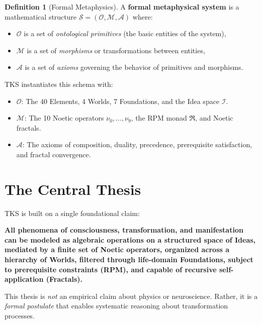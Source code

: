 \documentclass[11pt,twoside,openright]{book}
\theoremstyle{definition}
\newtheorem{definition}{Definition}[chapter]
\theoremstyle{plain}
\theoremstyle{remark}
\newcommand{\Ideas}{\mathcal{I}}
\newcommand{\noe}[1]{\nu_{#1}}
\newcommand{\RPM}{\mathfrak{R}}
\begin{document}
\begin{definition}[Formal Metaphysics]
\label{def:formal-metaphysics}
A \textbf{formal metaphysical system} is a mathematical structure $\mathcal{S} = (\mathcal{O}, \mathcal{M}, \mathcal{A})$ where:
\begin{itemize}
  \item $\mathcal{O}$ is a set of \emph{ontological primitives} (the basic entities of the system),
  \item $\mathcal{M}$ is a set of \emph{morphisms} or transformations between entities,
  \item $\mathcal{A}$ is a set of \emph{axioms} governing the behavior of primitives and morphisms.
\end{itemize}
\end{definition}

TKS instantiates this schema with:
\begin{itemize}
  \item $\mathcal{O}$: The 40 Elements, 4 Worlds, 7 Foundations, and the Idea space $\Ideas$.
  \item $\mathcal{M}$: The 10 Noetic operators $\noe{0}, \ldots, \noe{9}$, the RPM monad $\RPM$, and Noetic fractals.
  \item $\mathcal{A}$: The axioms of composition, duality, precedence, prerequisite satisfaction, and fractal convergence.
\end{itemize}

\section{The Central Thesis}

TKS is built on a single foundational claim:

\begin{tcolorbox}[colback=blue!5!white,colframe=blue!75!black,title=Central Thesis of TKS]
\textbf{All phenomena of consciousness, transformation, and manifestation can be modeled as algebraic operations on a structured space of Ideas, mediated by a finite set of Noetic operators, organized across a hierarchy of Worlds, filtered through life-domain Foundations, subject to prerequisite constraints (RPM), and capable of recursive self-application (Fractals).}
\end{tcolorbox}

This thesis is \emph{not} an empirical claim about physics or neuroscience. Rather, it is a \emph{formal postulate} that enables systematic reasoning about transformation processes.
\end{document}
